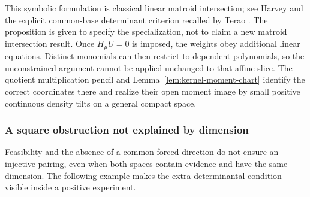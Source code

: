 This symbolic formulation is classical linear matroid intersection; see
Harvey \cite{Harvey2009} and the explicit common-base determinant
criterion recalled by Terao \cite[p.~39:2]{Terao2026}. The proposition
is given to specify the specialization, not to claim a new matroid
intersection result. Once $H_\mu U=0$ is imposed, the weights obey
additional linear equations. Distinct monomials can then restrict to
dependent polynomials, so the unconstrained argument cannot be applied
unchanged to that affine slice. The quotient multiplication pencil and
Lemma~\ref{lem:kernel-moment-chart} identify the correct coordinates
there and realize their open moment image by small positive continuous
density tilts on a general compact space.

\subsubsection{A square obstruction not explained by dimension}
Feasibility and the absence of a common forced direction do not ensure
an injective pairing, even when both spaces contain evidence and have
the same dimension. The following example makes the extra determinantal
condition visible inside a positive experiment.

